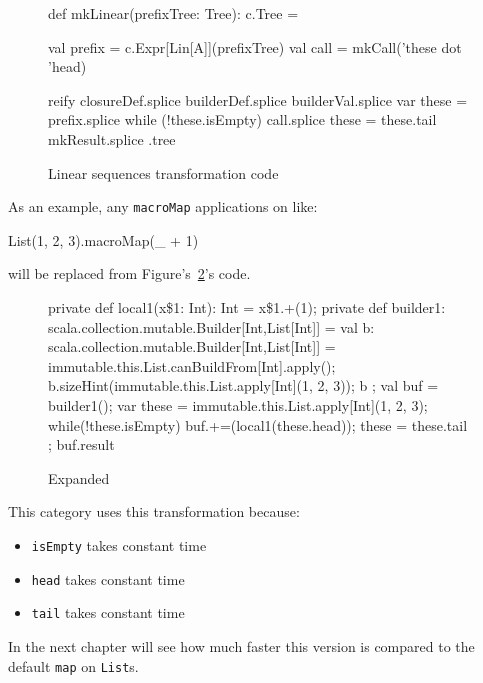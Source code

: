 \begin{figure}
\begin{scalaCode}
 def mkLinear(prefixTree: Tree): c.Tree = {
  val prefix = c.Expr[Lin[A]](prefixTree)
  val call   = mkCall('these dot 'head)

  reify {
    closureDef.splice
    builderDef.splice
    builderVal.splice
    var these = prefix.splice
    while (!these.isEmpty) {
      call.splice
      these = these.tail
    }
    mkResult.splice
  }.tree
}
\end{scalaCode}
\caption[Linear sequences transformation code]{Linear sequences transformation code}
\label{lin_transf}
\end{figure}


As an example, any
\texttt{macroMap} applications on  like:
\begin{scalaCode}
List(1, 2, 3).macroMap(\_ + 1)
\end{scalaCode}
will be replaced from Figure's~\ref{list_expansion}'s code.

\begin{figure}
\begin{scalaCode}
{
  private def local1(x\$1: Int): Int = x\$1.+(1);
  private def builder1: scala.collection.mutable.Builder[Int,List[Int]] = {
    val b: scala.collection.mutable.Builder[Int,List[Int]] =
immutable.this.List.canBuildFrom[Int].apply();
    b.sizeHint(immutable.this.List.apply[Int](1, 2, 3));
    b
  };
  val buf = builder1();
  var these = immutable.this.List.apply[Int](1, 2, 3);
  while(!these.isEmpty){
    buf.+=(local1(these.head));
    these = these.tail
  };
  buf.result
}
\end{scalaCode}
\caption[Expanded ]{Expanded }
\label{list_expansion}
\end{figure}

This category uses this transformation because:
\begin{itemize}
 \item
  \texttt{isEmpty} takes constant time
 \item
  \texttt{head} takes constant time
 \item
  \texttt{tail} takes constant time
\end{itemize}

In the next chapter will see how much faster this version is compared to the
default \texttt{map} on \texttt{List}s.

